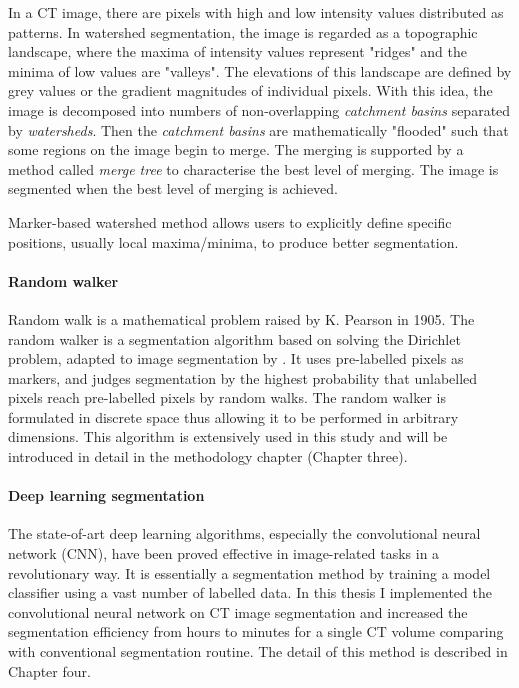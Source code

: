 In a CT image, there are pixels with high and low intensity values distributed as patterns. In watershed segmentation, the image is regarded as a topographic landscape, where the maxima of intensity values represent "ridges" and the minima of low values are "valleys". The elevations of this landscape are defined by grey values or the gradient magnitudes of individual pixels. With this idea, the image is decomposed into numbers of non-overlapping \textit{catchment basins} separated by \textit{watersheds}. Then the \textit{catchment basins} are mathematically "flooded" such that some regions on the image begin to merge. The merging is supported by a method called \textit{merge tree} to characterise the best level of merging. The image is segmented when the best level of merging is achieved.

Marker-based watershed method allows users to explicitly define specific positions, usually local maxima/minima, to produce better segmentation. 

\paragraph{Random walker}
Random walk is a mathematical problem raised by K. Pearson in 1905. The random walker is a segmentation algorithm based on solving the Dirichlet problem, adapted to image segmentation by \citet{grady2006random}. It uses pre-labelled pixels as markers, and judges segmentation by the highest probability that unlabelled pixels reach pre-labelled pixels by random walks. The random walker is formulated in discrete space thus allowing it to be performed in arbitrary dimensions. This algorithm is extensively used in this study and will be introduced in detail in the methodology chapter (Chapter three).

\paragraph{Deep learning segmentation}
The state-of-art deep learning algorithms, especially the convolutional neural network (CNN), have been proved effective in image-related tasks in a revolutionary way. It is essentially a segmentation method by training a model classifier using a vast number of labelled data. In this thesis I implemented the convolutional neural network on CT image segmentation and increased the segmentation efficiency from hours to minutes for a single CT volume comparing with conventional segmentation routine. The detail of this method is described in Chapter four.

